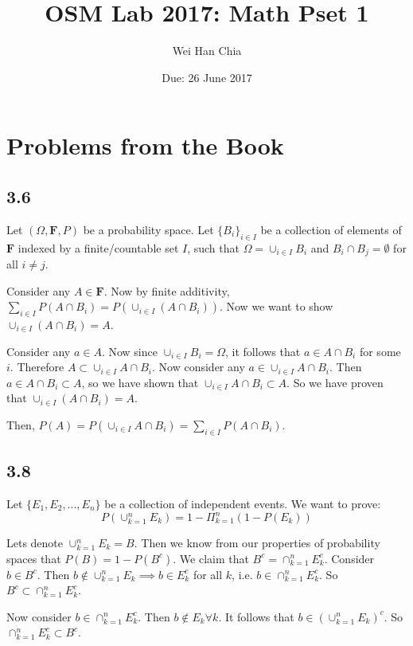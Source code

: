 \documentclass{article}
\begin{document}
	\title{OSM Lab 2017: Math Pset 1}
	\author{Wei Han Chia}
	\date{Due: 26 June 2017}
	\maketitle
	
	\section*{Problems from the Book}
	\subsection*{3.6}
	Let $(\Omega,\mathbf{F},P)$ be a probability space. Let $\{ B_i \}_{i \in I}$ be a collection of elements of $\mathbf{F}$ indexed by a finite/countable set $I$, such that $\Omega = \cup_{i \in I} B_i$ and $B_i \cap B_j = \emptyset$ for all $i \neq j$. 
	
	Consider any $A \in \mathbf{F}$. Now by finite additivity, $\sum_{i\in I} P(A \cap B_i) = P(\cup_{i \in I} (A \cap B_i))$. Now we want to show $\cup_{i \in I} (A \cap B_i) = A$.
	
	Consider any $a \in A$. Now since $\cup_{i \in I} B_i = \Omega$, it follows that $a \in A \cap B_i$ for some $i$. Therefore $A \subset \cup_{i \in I} A\cap B_i$. Now consider any $a \in \cup_{i \in I} A \cap B_i$. Then $a \in A \cap B_i \subset A$, so we have shown that  $\cup_{i \in I} A \cap B_i \subset A$. So we have proven that $\cup_{i \in I} (A \cap B_i) = A$.
	
	Then, $P(A) = P(\cup_{i \in I} A \cap B_i) = \sum_{i \in I} P(A \cap B_i)$.
	
	\subsection*{3.8}
	Let $\{ E_1, E_2,...,E_n \}$ be a collection of independent events. We want to prove:
	\[ P(\cup_{k=1}^{n} E_k) = 1 - \Pi_{k=1}^{n}(1- P(E_k)) \]
	
	Lets denote $\cup_{k=1}^{n} E_k = B$. Then we know from our properties of probability spaces that $P(B) = 1 - P(B^{c})$. We claim that $B^{c} = \cap_{k=1}^{n} E_k^{c}$. Consider $b \in B^{c}$. Then $b \notin \cup_{k=1}^{n} E_k \implies b \in E_k^{c}$ for all $k$, i.e. $b \in \cap_{k=1}^{n} E_k^{c}$. So $B^c \subset \cap_{k=1}^{n} E_k^{c}$.
	
	Now consider $b \in \cap_{k=1}^{n} E_k^{c}$. Then $b \notin E_k \forall k$. It follows that $b \in (\cup_{k=1}^{n}E_k)^{c}$. So $\cap_{k=1}^{n} E_k^{c} \subset B^c$.
	
\end{document}

